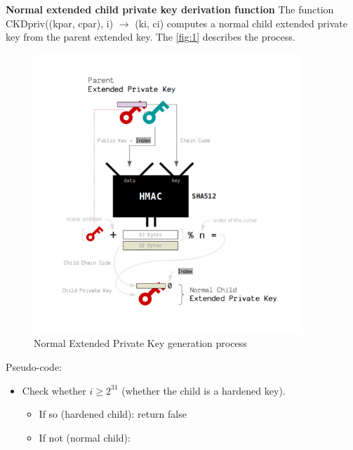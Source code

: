\bigskip
\begin{adjustwidth}{0.5cm}{}

    {\textbf{Normal extended child private key derivation function}}
    \label{norm1}
    The function CKDpriv((kpar, cpar), i) $\rightarrow$ (ki, ci) computes a normal child extended private key from the parent extended key.
    The \autoref{fig:1} describes the process.

    \begin{figure}[ht!]
        \centering
        \includegraphics[width=0.9\textwidth]{images/normal_extended_private_gen.png}
        \caption[Normal Extended Private Key generation process]{Normal Extended Private Key generation process}
        \label{fig:1}
    \end{figure}

    Pseudo-code:
    \begin{itemize}
        \item Check whether $i \geq 2^{31}$ (whether the child is a hardened key).
              \begin{itemize}
                  \item If so (hardened child): return false

                  \item If not (normal child):
                        \begin{quote}


\end{quote}
\end{itemize}
\end{itemize}
\end{adjustwidth}
